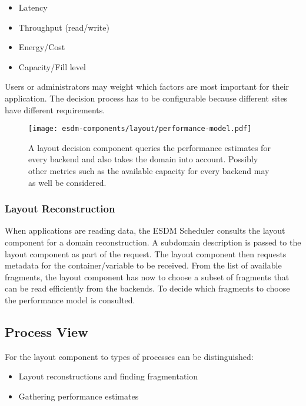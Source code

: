 \begin{itemize}
	\item Latency
	\item Throughput (read/write)
	\item Energy/Cost
	\item Capacity/Fill level
\end{itemize}

Users or administrators may weight which factors are most important for their application.
The decision process has to be configurable because different sites have different requirements.

\begin{figure}
	\centering
	\texttt{[image: esdm-components/layout/performance-model.pdf]}
	\caption{A layout decision component queries the performance estimates for every backend and also takes the domain into account. Possibly other metrics such as the available capacity for every backend may as well be considered.}
	\label{fig:esdm layout choose backend}
\end{figure}



\subsubsection{Layout Reconstruction}

When applications are reading data, the ESDM Scheduler consults the layout component for a domain reconstruction.
A subdomain description is passed to the layout component as part of the request.
The layout component then requests metadata for the container/variable to be received.
From the list of available fragments, the layout component has now to choose a subset of fragments that can be read efficiently from the backends.
To decide which fragments to choose the performance model is consulted.


\subsection{Process View}

For the layout component to types of processes can be distinguished:

\begin{itemize}
	\item Layout reconstructions and finding fragmentation
	\item Gathering performance estimates
\end{itemize}


